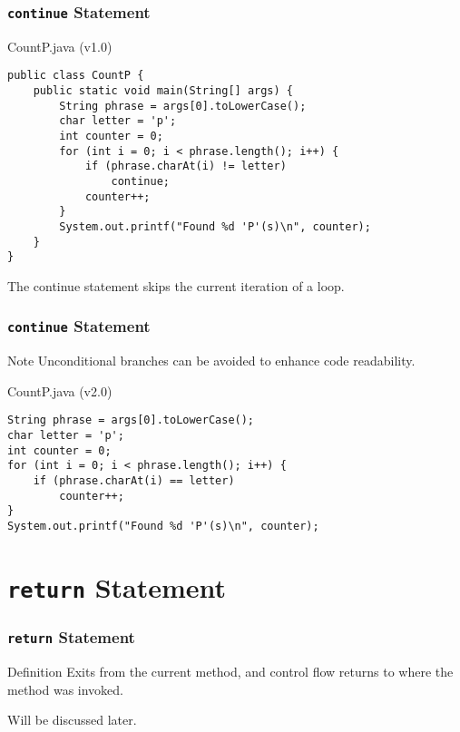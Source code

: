 \documentclass[10pt, compress]{beamer}
\begin{document}
\begin{frame}[fragile]
	\frametitle{\texttt{continue} Statement}
	\begin{block}{CountP.java (v1.0)}
		\begin{verbatim}
public class CountP {
	public static void main(String[] args) {
		String phrase = args[0].toLowerCase();
		char letter = 'p';
		int counter = 0;
		for (int i = 0; i < phrase.length(); i++) {
			if (phrase.charAt(i) != letter)
				continue;
			counter++;
		}
		System.out.printf("Found %d 'P'(s)\n", counter);
	}
}
		\end{verbatim}
	\end{block}
	The continue statement skips the current iteration of a loop.
\end{frame}

\begin{frame}[fragile]
	\frametitle{\texttt{continue} Statement}
	\begin{block}{Note}
	Unconditional branches can be avoided to enhance code readability.
	\end{block}
	\begin{block}{CountP.java (v2.0)}
		\begin{verbatim}
String phrase = args[0].toLowerCase();
char letter = 'p';
int counter = 0;
for (int i = 0; i < phrase.length(); i++) {
	if (phrase.charAt(i) == letter)
		counter++;
}
System.out.printf("Found %d 'P'(s)\n", counter);
		\end{verbatim}
	\end{block}
\end{frame}


\section{\texttt{return} Statement}

\begin{frame}[fragile]
	\frametitle{\texttt{return} Statement}
	\begin{block}{Definition}
	Exits from the current method, and control flow returns to where the method was invoked.
	\end{block}
	Will be discussed later.
\end{frame}

\end{document}
